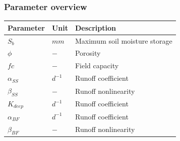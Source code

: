 \subsubsection{Parameter overview}
\begin{table}[htbp]
  \centering
    \begin{tabular}{lll}
    \toprule
    Parameter & Unit  & Description \\
    \midrule
    $S_b$ & $mm$  & Maximum soil moisture storage \\
    $\phi$ & $-$   & Porosity \\
    $fc$  & $-$   & Field capacity \\
    $\alpha_{SS}$ & $d^{-1}$ & Runoff coefficient \\
    $\beta_{SS}$ & $-$   & Runoff nonlinearity \\
    $K_{deep}$ & $d^{-1}$ & Runoff coefficient \\
    $\alpha_{BF}$ & $d^{-1}$ & Runoff coefficient \\
    $\beta_{BF}$ & $-$   & Runoff nonlinearity \\
    \bottomrule
    \end{tabular}%
  \label{tab:addlabel}%
\end{table}%

